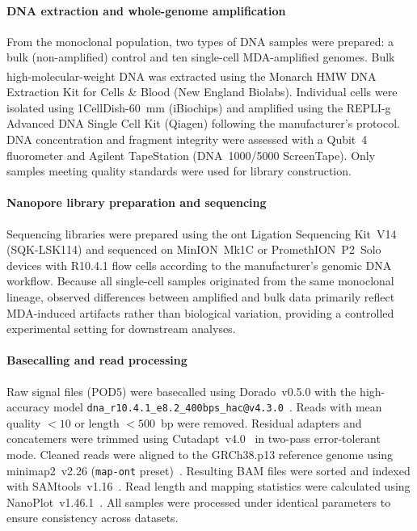 \documentclass[pdflatex,sn-nature,lineno]{sn-jnl}%
\theoremstyle{thmstyleone}%
\theoremstyle{thmstyletwo}%
\theoremstyle{thmstylethree}%
\begin{document}
\paragraph{DNA extraction and whole-genome amplification}
From the monoclonal population, two types of DNA samples were prepared: a bulk (non-amplified) control and ten single-cell MDA-amplified genomes. Bulk high-molecular-weight DNA was extracted using the Monarch\textsuperscript{\textregistered} HMW DNA Extraction Kit for Cells \& Blood (New England Biolabs). Individual cells were isolated using 1CellDish-60~mm (iBiochips) and amplified using the REPLI-g Advanced DNA Single Cell Kit (Qiagen) following the manufacturer's protocol. DNA concentration and fragment integrity were assessed with a Qubit~4 fluorometer and Agilent TapeStation (DNA~1000/5000 ScreenTape). Only samples meeting quality standards were used for library construction.

\paragraph{Nanopore library preparation and sequencing}
Sequencing libraries were prepared using the \gls{ont} Ligation Sequencing Kit~V14 (SQK-LSK114) and sequenced on MinION~Mk1C or PromethION~P2~Solo devices with R10.4.1 flow cells according to the manufacturer's genomic DNA workflow. Because all single-cell samples originated from the same monoclonal lineage, observed differences between amplified and bulk data primarily reflect MDA-induced artifacts rather than biological variation, providing a controlled experimental setting for downstream analyses.

\paragraph{Basecalling and read processing}
Raw signal files (POD5) were basecalled using Dorado~v0.5.0 with the high-accuracy model \texttt{dna\_r10.4.1\_e8.2\_400bps\_hac@v4.3.0}~\cite{dorado2023}. Reads with mean quality $< 10$ or length $< 500$~bp were removed. Residual adapters and concatemers were trimmed using Cutadapt~v4.0~\cite{martin2011cutadapt} in two-pass error-tolerant mode. Cleaned reads were aligned to the GRCh38.p13 reference genome using minimap2~v2.26 (\texttt{map-ont} preset)~\cite{li2018minimap2}. Resulting BAM files were sorted and indexed with SAMtools~v1.16~\cite{danecek2021twelve}.
Read length and mapping statistics were calculated using NanoPlot~v1.46.1~\cite{decoster2023nanopack2}.
All samples were processed under identical parameters to ensure consistency across datasets.
\end{document}

